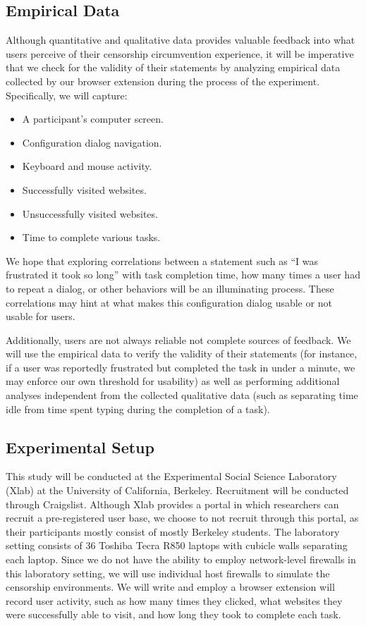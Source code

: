 \documentclass[letterpaper,twocolumn,11pt]{article}
\begin{document}
\subsection{Empirical Data} 
Although quantitative and qualitative data provides valuable feedback into what users perceive of 
their censorship circumvention experience, it will be imperative that we check for the validity of their 
statements by analyzing empirical data collected by our browser extension during the process of the
experiment. Specifically, we will capture: 

\begin{itemize} \itemsep1pt \parskip0pt 
\item A participant's computer screen. 
\item Configuration dialog navigation. 
\item Keyboard and mouse activity.
\item Successfully visited websites. 
\item Unsuccessfully visited websites. 
\item Time to complete various tasks.
\end{itemize}

We hope that exploring correlations between a statement such as  ``I was frustrated it took so long'' 
with task completion time, how many times a user had to repeat a dialog, or other behaviors 
will be an illuminating process. These correlations may hint at what makes this configuration dialog 
usable or not usable for users. 

Additionally, users are not always reliable not complete sources of feedback. We will use the 
empirical data to verify the validity of their statements (for instance, if a user was reportedly frustrated 
but completed the task in under a minute, we may enforce our own threshold for usability) as well as 
performing additional analyses independent from the collected qualitative data (such as separating time
idle from time spent typing during the completion of a task).

\subsection{Experimental Setup} 

\indent\indent This study will be conducted at the Experimental Social Science Laboratory (Xlab)
at the University of California, Berkeley. Recruitment will be conducted through Craigslist. 
Although Xlab provides a portal in which researchers can recruit a pre-registered user base,
we choose to not recruit through this portal, as their participants mostly consist of mostly Berkeley 
students. The laboratory setting consists of 36 Toshiba Tecra R850 laptops with cubicle walls 
separating each laptop. Since we do not have the ability to employ network-level firewalls in this
laboratory setting, we will use individual host firewalls to simulate the censorship environments.  
We will write and employ a browser extension will record user activity, such as how many times they 
clicked, what websites they were successfully able to visit, and how long they took to complete 
each task. 
\end{document}
